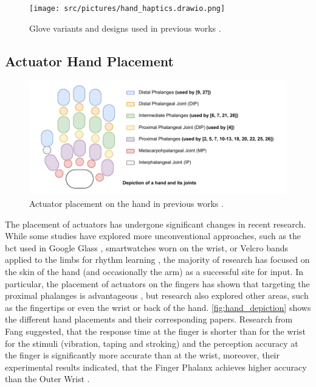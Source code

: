 \begin{figure}[!ht]
    \centering

    \texttt{[image: src/pictures/hand\_haptics.drawio.png]}
    \caption{Glove variants and designs used in previous works \cite{Donchev2021,Fang2023,Fang2023a,Huang2008,Huang2010,Learning2024,Luzhnica2016,Markow2010,Seim2014a,Seim2017,Seim2015b,Seim2014,Vaio6810}.}
    \label{fig:glove_designs}

\end{figure}

\subsection*{Actuator Hand Placement}
 \begin{figure}[!ht]
    \centering
    \includegraphics[width=\linewidth]{src/pictures/hand_Depiction.drawio.pdf}
    \caption{Actuator placement on the hand in previous works \cite{Learning2024,Fang2023,Fang2023a,Fang2022,Fang2022a,Donchev2021,Hsu2021,Yang2017,Seim2017,Seim2015b,Seim2014a,Seim2014, Huang2010, Vaio6810, Kohlsdorf2010, Markow2010, Huang2008}.}
    \label{fig:hand_depiction}
\end{figure}
The placement of actuators has undergone significant changes in recent research. While some studies have explored more unconventional approaches, such as the \gls{bct} used in Google Glass \cite{Seim2016a}, smartwatches \cite{Seim2018} worn on the wrist, or Velcro bands applied to the limbs for rhythm learning \cite{Bouwer2011, Holland2010}, the majority of research has focused on the skin of the hand (and occasionally the arm) as a successful site for input.
In particular, the placement of actuators on the fingers has shown that targeting the proximal phalanges is advantageous \cite{Fang2022a}, but research also explored other areas, such as the fingertips \cite{Yang2017} or even the wrist or back of the hand. \autoref{fig:hand_depiction} shows the different hand placements and their corresponding papers.
Research from Fang suggested, that the response time at the finger is shorter than for the wrist for the stimuli (vibration, taping and stroking) and the perception accuracy at the finger is significantly more accurate than at the wrist, moreover, their experimental results indicated, that the Finger Phalanx achieves higher accuracy than the Outer Wrist \cite{Fang2022a}.

